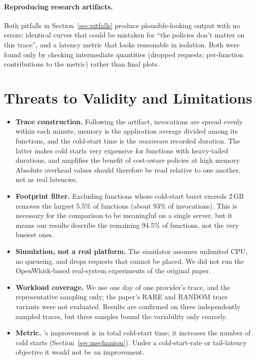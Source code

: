 \documentclass[11pt,a4paper]{article}
\newcommand{\gdw}{\text{GD-W}}
\begin{document}
\paragraph{Reproducing research artifacts.} Both pitfalls in Section~\ref{sec:pitfalls} produce
plausible-looking output with no errors: identical curves that could be mistaken for ``the
policies don't matter on this trace'', and a latency metric that looks reasonable in isolation.
Both were found only by checking intermediate quantities (dropped requests; per-function
contributions to the metric) rather than final plots.

\section{Threats to Validity and Limitations}
\label{sec:limitations}

\begin{itemize}
  \item \textbf{Trace construction.} Following the artifact, invocations are spread evenly
        within each minute, memory is the application average divided among its functions,
        and the cold-start time is the \emph{maximum} recorded duration. The latter makes
        cold starts very expensive for functions with heavy-tailed durations, and amplifies
        the benefit of cost-aware policies at high memory. Absolute overhead values should
        therefore be read relative to one another, not as real latencies.
  \item \textbf{Footprint filter.} Excluding functions whose cold-start burst exceeds 2\,GB
        removes the largest 5.5\% of functions (about 93\% of invocations). This is necessary
        for the comparison to be meaningful on a single server, but it means our results
        describe the remaining 94.5\% of functions, not the very busiest ones.
  \item \textbf{Simulation, not a real platform.} The simulator assumes unlimited CPU, no
        queueing, and drops requests that cannot be placed. We did not run the OpenWhisk-based
        real-system experiments of the original paper.
  \item \textbf{Workload coverage.} We use one day of one provider's trace, and the
        representative sampling only; the paper's RARE and RANDOM trace variants were not
        evaluated. Results are confirmed on three independently sampled traces, but three
        samples bound the variability only coarsely.
  \item \textbf{Metric.} \gdw{}'s improvement is in total cold-start time; it increases the
        number of cold starts (Section~\ref{sec:mechanism}). Under a cold-start-rate or
        tail-latency objective it would not be an improvement.
\end{itemize}
\end{document}
